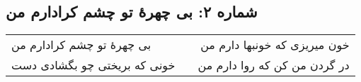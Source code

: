 \begin{center}
\section*{شماره ۲: بی چهرۀ تو چشم کرادارم من}
\label{sec:002}
\begin{longtable}{l p{0.5cm} r}
بی چهرهٔ تو چشم کرادارم من
&&
خون میریزی که خونبها دارم من
\\
خونی که بریختی چو بگشادی دست
&&
در گردن من کن که روا دارم من
\\
\end{longtable}
\end{center}
